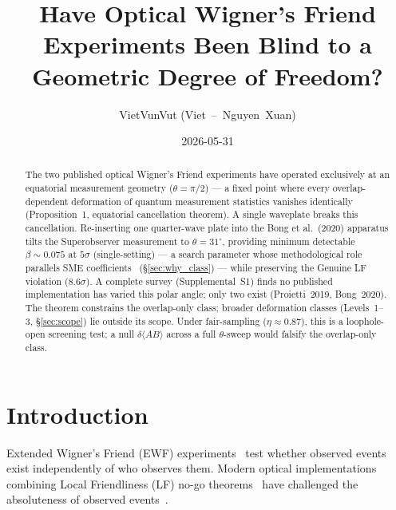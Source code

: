 \documentclass[twocolumn,aps,pra,superscriptaddress,floatfix,10pt]{revtex4-2}
\begin{document}
\title{Have Optical Wigner's Friend Experiments Been Blind to a Geometric Degree of Freedom?}

\author{VietVunVut (Viet~--~Nguyen~Xuan)}

\date{2026-05-31}

\begin{abstract}
The two published optical Wigner's Friend experiments have operated
exclusively at an equatorial measurement geometry ($\theta = \pi/2$) --- a fixed
point where every overlap-dependent deformation of quantum measurement
statistics vanishes identically (Proposition~1, equatorial cancellation
theorem). A single waveplate breaks this cancellation. Re-inserting one
quarter-wave plate into the Bong et al.\ (2020) apparatus tilts the
Superobserver measurement to $\theta = 31^\circ$, providing minimum detectable
$\beta \sim 0.075$ at $5\sigma$ (single-setting) --- a search parameter whose methodological role parallels
SME coefficients~\cite{Colladay1997} (\S\ref{sec:why_class}) --- while preserving the Genuine LF violation
($8.6\sigma$). A complete survey (Supplemental~S1) finds no published
implementation has varied this polar angle; only two exist (Proietti~2019,
Bong~2020). The theorem constrains the overlap-only class; broader
deformation classes (Levels~1--3, \S\ref{sec:scope}) lie outside its scope. Under
fair-sampling ($\eta \approx 0.87$), this is a loophole-open screening test; a null
$\delta\langle AB\rangle$ across a full $\theta$-sweep would falsify the overlap-only class.
\end{abstract}

\maketitle

\section{Introduction}
\label{sec:intro}

Extended Wigner's Friend (EWF) experiments~\cite{Proietti2019,Bong2020} test whether observed events
exist independently of who observes them. Modern optical implementations
combining Local Friendliness (LF) no-go theorems~\cite{Bong2020,Wiseman2023,Haddara2024a} have challenged the
absoluteness of observed events~\cite{Haddara2023b,Kent2023}.
\end{document}
